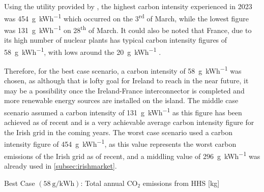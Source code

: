 Using the  \cite{eirgrid_group_explore_2023} utility provided by \citeauthor{eirgrid_group_explore_2023}, the highest carbon intensity experienced in 2023 was \qty{454}{\gram\per\kWh} which occurred on the 3\textsuperscript{rd} of March, while the lowest figure was \qty{131}{\gram\per\kWh} on 28\textsuperscript{th} of March. It could also be noted that France, due to its high number of nuclear plants has typical carbon intensity figures of \qty{58}{\gram\per\kWh}, with lows around the \qty{20}{\gram\per\kWh} \cite{iea2019world}.

Therefore, for the best case scenario, a carbon intensity of \qty{58}{\gram\per\kWh} was chosen, as although that is lofty goal for Ireland to reach in the near future, it may be a possibility once the Ireland-France interconnector is completed and more renewable energy sources are installed on the island. The middle case scenario assumed a carbon intensity of \qty{131}{\gram\per\kWh} as this figure has been achieved as of recent and is a very achievable average carbon intensity figure for the Irish grid in the coming years. The worst case scenario used a carbon intensity figure of \qty{454}{\gram\per\kWh}, as this value represents the worst carbon emissions of the Irish grid as of recent, and a middling value of \qty{296}{\gram\per\kWh} was already used in \cref{subsec:irishmarket}.

\begin{table}[htb]
    \footnotesize
    \centering
    \caption{Best Case $\left(\qty{58}{\gram\per\kWh}\right)$: Total annual $\text{CO}_2$ emissions from \acs{HHS} [kg]}
    \label{tbl:bestcase}
\end{table}

